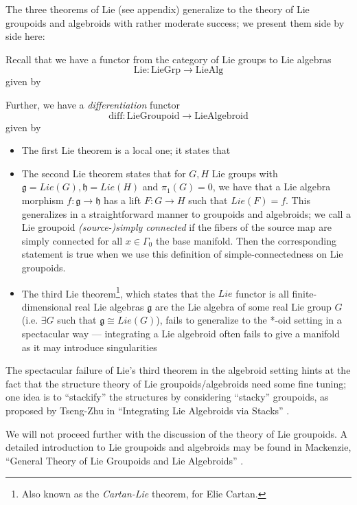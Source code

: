 The three theorems of Lie (see appendix) generalize to the theory of Lie groupoids and algebroids with rather moderate success; we present them side by side here:
\begin{thrm}
Recall that we have a functor from the category of Lie groups to Lie algebras
$$
\mathrm{Lie}: \mathrm{LieGrp} \to \mathrm{LieAlg}
$$
given by %

Further, we have a \emph{differentiation} functor
$$
\mathrm{diff}: \mathrm{LieGroupoid} \to \mathrm{LieAlgebroid}
$$
given by %
\begin{itemize}
\item The first Lie theorem is a local one; it states that %

\item The second Lie theorem states that for $G,H$ Lie groups with $\mathfrak{g} = Lie(G), \mathfrak{h} = Lie(H)$ and $\pi_1(G) = 0$, we have that a Lie algebra morphism $f: \mathfrak{g} \to \mathfrak{h}$ has a lift $F: G \to H$ such that $Lie(F) = f$. This generalizes in a straightforward manner to groupoids and algebroids; we call a Lie groupoid \emph{(source-)simply connected} if the fibers of the source map are simply connected for all $x \in \Gamma_0$ the base manifold. Then the corresponding statement is true when we use this definition of simple-connectedness on Lie groupoids.

\item The third Lie theorem\footnote{Also known as the \emph{Cartan-Lie} theorem, for Elie Cartan.}, which states that the $Lie$ functor is all finite-dimensional real Lie algebras $\mathfrak{g}$ are the Lie algebra of some real Lie group $G$ (i.e. $\exists G$ such that $\mathfrak{g} \cong Lie(G)$), fails to generalize to the *-oid setting in a spectacular way --- integrating a Lie algebroid often fails to give a manifold as it may introduce singularities %

\end{itemize}
\end{thrm}
The spectacular failure of Lie's third theorem in the algebroid setting hints at the fact that the structure theory of Lie groupoids/algebroids need some fine tuning; one idea is to ``stackify'' the structures by considering ``stacky'' groupoids, as proposed by Tseng-Zhu in ``Integrating Lie Algebroids via Stacks'' \cite{tsengzhu}.

We will not proceed further with the discussion of the theory of Lie groupoids. A detailed introduction to Lie groupoids and algebroids may be found in Mackenzie, ``General Theory of Lie Groupoids and Lie Algebroids'' \cite{mackenzie}.
